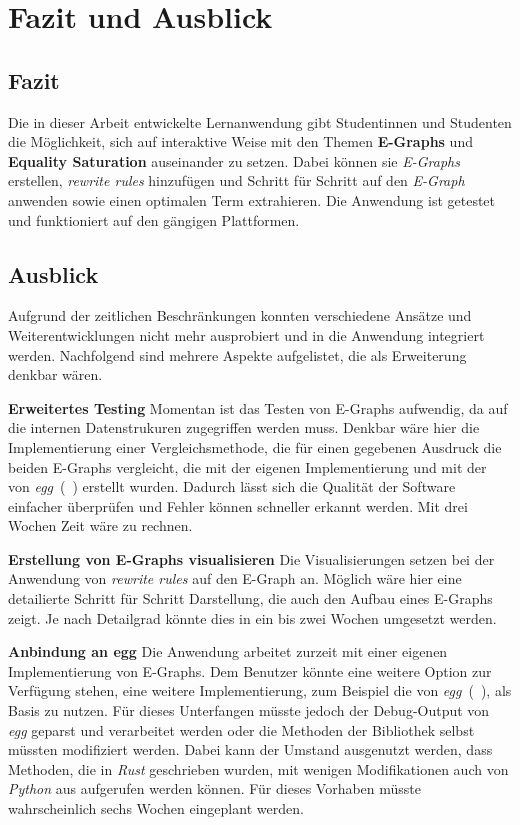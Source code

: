 \section{Fazit und Ausblick}\label{sec:fazit}

\subsection{Fazit}

Die in dieser Arbeit entwickelte Lernanwendung gibt Studentinnen und Studenten die Möglichkeit, sich auf interaktive Weise mit den Themen \textbf{E-Graphs} und 
\textbf{Equality Saturation} auseinander zu setzen. Dabei können sie \textit{E-Graphs} erstellen, \textit{rewrite rules} hinzufügen und Schritt für Schritt 
auf den \textit{E-Graph} anwenden sowie einen optimalen Term extrahieren. Die Anwendung ist getestet und funktioniert auf den gängigen Plattformen.

\subsection{Ausblick}

Aufgrund der zeitlichen Beschränkungen konnten verschiedene Ansätze und Weiterentwicklungen nicht mehr ausprobiert und in die Anwendung integriert werden.
Nachfolgend sind mehrere Aspekte aufgelistet, die als Erweiterung denkbar wären. 

\textbf{Erweitertes Testing} Momentan ist das Testen von E-Graphs aufwendig, da auf die internen Datenstrukuren zugegriffen werden muss.
Denkbar wäre hier die Implementierung einer Vergleichsmethode, die für einen gegebenen Ausdruck die beiden E-Graphs vergleicht,
die mit der eigenen Implementierung und mit der von \textit{egg}~(~\cite{2021-egg}) erstellt wurden. 
Dadurch lässt sich die Qualität der Software einfacher überprüfen und Fehler können schneller erkannt werden.
Mit drei Wochen Zeit wäre zu rechnen.

\textbf{Erstellung von E-Graphs visualisieren} Die Visualisierungen setzen bei der Anwendung von \textit{rewrite rules} auf den E-Graph an.
Möglich wäre hier eine detailierte Schritt für Schritt Darstellung, die auch den Aufbau eines E-Graphs zeigt. Je nach Detailgrad könnte dies in ein bis zwei Wochen umgesetzt werden.

\textbf{Anbindung an egg} Die Anwendung arbeitet zurzeit mit einer eigenen Implementierung von E-Graphs. Dem Benutzer könnte eine weitere Option zur Verfügung stehen, eine weitere
Implementierung, zum Beispiel die von \textit{egg}~(~\cite{2021-egg}), als Basis zu nutzen.
Für dieses Unterfangen müsste jedoch der Debug-Output von \textit{egg} geparst und verarbeitet werden oder die Methoden der Bibliothek selbst müssten modifiziert werden.
Dabei kann der Umstand ausgenutzt werden, dass Methoden, die in \textit{Rust} geschrieben wurden, mit wenigen Modifikationen auch von \textit{Python} aus aufgerufen werden können.
Für dieses Vorhaben müsste wahrscheinlich sechs Wochen eingeplant werden.

